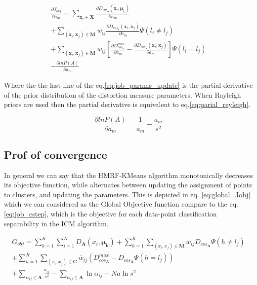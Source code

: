 \documentclass[dvips,dvipdfm,pdftex]{llncs}
\begin{document}
\begin{equation}
	\begin{split}
	\frac{\partial J_{obj}}{\partial a_{m}}=\sum_{\mathbf{x}_{i}\in\mathbf{X}}\frac{\partial D_{cos_{\mathbf{a}}}(\mathbf{x}_{i},\mathbf{\mu}_{l_{i}})}{\partial a_{m}}\\
		+\sum_{(\mathbf{x}_{i},\mathbf{x}_{j})\in\mathbf{M}}w_{ij}\frac{\partial D_{cos_{\mathbf{a}}}(\mathbf{x}_{i},\mathbf{x}_{j})}{\partial a_{m}}\Psi(l_{i}\neq l_{j})\\
		+\sum_{(\mathbf{x}_{i},\mathbf{x}_{j})\in\mathbf{M}}\overline{w}_{ij}\left[\frac{\partial D_{cos_{\mathbf{a}}}^{max}}{\partial a_{m}}-\frac{\partial D_{cos_{\mathbf{a}}}(\mathbf{x}_{i},\mathbf{x}_{j})}{\partial a_{m}}\right]\Psi(l_{i}=l_{j})\\
		-\frac{\partial lnP(A)}{\partial a_{m}}
	\end{split}
\label{eq:job_params_update}
\end{equation}

Where the the last line of the eq.\ref{eq:job_params_update} is the partial derivative of the prior distribution of the distortion measure parameters. When Rayleigh priors are used then the partial derivative is equivalent to eq.\ref{eq:parial_reyleigh}.

\begin{equation}
	\frac{\partial lnP(A)}{\partial a_{m}} = \frac{1}{a_{m}}-\frac{a_{m}}{s^{2}}
\label{eq:parial_reyleigh}
\end{equation}

\subsection{Prof of convergence}
In general we can say that the HMRF-KMeans algorithm monotonically decreases its objective function, while alternates between updating the assignment of points to clusters, and updating the parameters. This is depicted in eq. \ref{eq:global_Jobj} which we can considered as the Global Objective function compare to the eq.\ref{eq:job_estep}, which is the objective for each data-point classification separability in the ICM algorithm.

\begin{equation}
	\begin{split}
		G_{obj}=\sum_{h=1}^{K}\sum_{i=1}^{N}D_{\mathbf{A}}(x_{i},\mathbf{\mu}_{\mathbf{h}})
		+\sum_{h=1}^{K}\sum_{(x_{i},x_{j})\in\mathbf{M}}w_{ij}D_{cos_{\mathbf{A}}}\Psi(h\neq l_{j}) \\
		+\sum_{h=1}^{K}\sum_{(x_{i},x_{j})\in\mathbf{C}}\overline{w}_{ij}(D_{cos_{\mathbf{A}}}^{max}-D_{cos_{\mathbf{A}}}\Psi(h=l_{j})) \\
		+\sum_{\alpha_{ij}\in\mathbf{A}}\frac{a_{ij}}{s^{2}}-\sum_{\alpha_{ij}\in\mathbf{A}}\ln\alpha_{ij}+ \mathit{Na} \ln s^{2}
	\end{split}
\label{eq:global_Jobj}
\end{equation}
\end{document}
